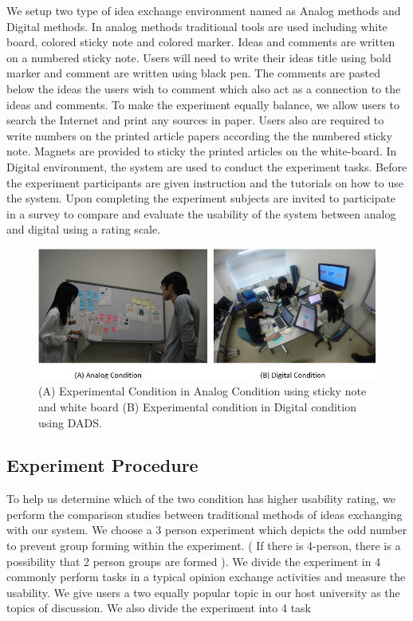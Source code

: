 \documentclass{sigchi}
\begin{document}
\begin{itemize}
\begin{itemize}
We setup two type of idea exchange environment named as Analog methods and Digital methods. In analog methods traditional tools are used including white board, colored sticky note and colored marker. Ideas and comments are written on a numbered  sticky note. Users will need to write their ideas title using bold marker and comment are written using black pen. The comments  are pasted below the ideas the users wish to comment which also act as a connection to the ideas and comments. To make the experiment equally balance, we allow users to search the Internet and print any sources in paper. Users also are required to write numbers on the printed article papers according the the numbered sticky note. Magnets are provided to sticky the printed articles on the white-board. In Digital environment, the system are used to conduct the experiment tasks. Before the experiment participants are given instruction and the tutorials on how to use the system. Upon completing the experiment subjects are invited to participate in a survey to compare and evaluate the usability of the system between analog and digital using a rating scale.

\begin{figure}[!h]
\centering
\includegraphics[width=1.0\columnwidth]{condition}
\caption{(A) Experimental Condition in Analog Condition using sticky note and white board (B) Experimental condition in Digital condition using DADS.}
\label{fig:figure1}
\end{figure}


\subsection{Experiment Procedure}

To help us determine which of the two condition has higher usability rating, we perform the comparison studies between  traditional methods of ideas exchanging  with our system. We choose a 3 person experiment which depicts the odd number to prevent group forming within the experiment. ( If there is 4-person, there is a possibility that 2 person groups are formed ). We divide the experiment in 4 commonly perform tasks in a typical opinion exchange activities and measure the usability.  We give users a two equally popular topic in our host university as the topics of discussion. We also divide the experiment into 4 task


\end{itemize}
\end{itemize}
\end{document}
